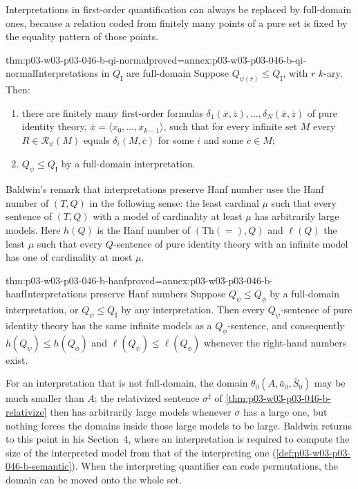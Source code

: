 Interpretations in first-order quantification can always be replaced by
full-domain ones, because a relation coded from finitely many points of a
pure set is fixed by the equality pattern of those points.

\begin{hblemma}{thm:p03-w03-p03-046-b-qi-normal}{proved=annex:p03-w03-p03-046-b-qi-normal}{Interpretations in \(Q_{\mathrm I}\) are full-domain}
Suppose \(Q_{\psi(r)}\le Q_{\mathrm I}\), with \(r\) \(k\)-ary. Then:
\begin{enumerate}
  \item there are finitely many first-order formulas
        \(\delta_1(\bar x,\bar z),\dots,\delta_N(\bar x,\bar z)\) of pure
        identity theory, \(\bar x=\langle x_0,\dots,x_{k-1}\rangle\), such
        that for every infinite set \(M\) every \(R\in\mathscr R_\psi(M)\)
        equals \(\delta_i(M,\bar c)\) for some \(i\) and some \(\bar c\in M\);
  \item \(Q_\psi\le Q_{\mathrm I}\) by a full-domain interpretation.
\end{enumerate}
\end{hblemma}

Baldwin's remark that interpretations preserve Hanf number
\cite[p.~448]{Baldwin1985DSOQ} uses the Hanf number of \((T,Q)\) in the
following sense: the least cardinal \(\mu\) such that every sentence of
\((T,Q)\) with a model of cardinality at least \(\mu\) has arbitrarily large
models. Here \(h(Q)\) is the Hanf number of \((\mathrm{Th}(=),Q)\) and
\(\ell(Q)\) the least \(\mu\) such that every \(Q\)-sentence of pure identity
theory with an infinite model has one of cardinality at most \(\mu\).

\begin{hbcorollary}{thm:p03-w03-p03-046-b-hanf}{proved=annex:p03-w03-p03-046-b-hanf}{Interpretations preserve Hanf numbers}
Suppose \(Q_\psi\le Q_\phi\) by a full-domain interpretation, or
\(Q_\psi\le Q_{\mathrm I}\) by any interpretation. Then every
\(Q_\psi\)-sentence of pure identity theory has the same infinite models as
a \(Q_\phi\)-sentence, and consequently \(h(Q_\psi)\le h(Q_\phi)\) and
\(\ell(Q_\psi)\le\ell(Q_\phi)\) whenever the right-hand numbers exist.
\end{hbcorollary}

For an interpretation that is not full-domain, the domain
\(\theta_0(A,\bar a_0,\bar S_0)\) may be much smaller than \(A\): the
relativized sentence \(\sigma^\sharp\) of
\cref{thm:p03-w03-p03-046-b-relativize} then has arbitrarily large models
whenever \(\sigma\) has a large one, but nothing forces the domains inside
those large models to be large. Baldwin returns to this point in his
Section~4, where an interpretation is required to compute the size of the
interpreted model from that of the interpreting one
\cite[pp.~470--471]{Baldwin1985DSOQ}
(\cref{def:p03-w03-p03-046-b-semantic}). When the interpreting quantifier
can code permutations, the domain can be moved onto the whole set.

